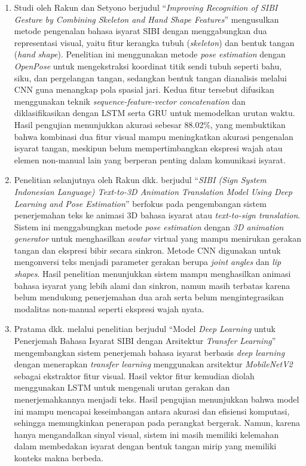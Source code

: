 \begin{enumerate}[noitemsep]
	\item Studi oleh Rakun dan Setyono \cite{RakunSetyono2022} berjudul ``\textit{Improving Recognition of SIBI Gesture by Combining Skeleton and Hand Shape Features}'' mengusulkan metode pengenalan bahasa isyarat SIBI dengan menggabungkan dua representasi visual, yaitu fitur kerangka tubuh (\textit{skeleton}) dan bentuk tangan (\textit{hand shape}). Penelitian ini menggunakan metode \textit{pose estimation} dengan \textit{OpenPose} untuk mengekstraksi koordinat titik sendi tubuh seperti bahu, siku, dan pergelangan tangan, sedangkan bentuk tangan dianalisis melalui CNN guna menangkap pola spasial jari. Kedua fitur tersebut difusikan menggunakan teknik \textit{sequence-feature-vector concatenation} dan diklasifikasikan dengan LSTM serta GRU untuk memodelkan urutan waktu. Hasil pengujian menunjukkan akurasi sebesar 88.02\%, yang membuktikan bahwa kombinasi dua fitur visual mampu meningkatkan akurasi pengenalan isyarat tangan, meskipun belum mempertimbangkan ekspresi wajah atau elemen non-manual lain yang berperan penting dalam komunikasi isyarat. \par
	\item Penelitian selanjutnya oleh Rakun dkk. \cite{RakunDarmana2022} berjudul ``\textit{SIBI (Sign System Indonesian Language) Text-to-3D Animation Translation Model Using Deep Learning and Pose Estimation}'' berfokus pada pengembangan sistem penerjemahan teks ke animasi 3D bahasa isyarat atau \textit{text-to-sign translation}. Sistem ini menggabungkan metode \textit{pose estimation} dengan \textit{3D animation generator} untuk menghasilkan \textit{avatar} virtual yang mampu menirukan gerakan tangan dan ekspresi bibir secara sinkron. Metode CNN digunakan untuk mengonversi teks menjadi parameter gerakan berupa \textit{joint angles} dan \textit{lip shapes}. Hasil penelitian menunjukkan sistem mampu menghasilkan animasi bahasa isyarat yang lebih alami dan sinkron, namun masih terbatas karena belum mendukung penerjemahan dua arah serta belum mengintegrasikan modalitas non-manual seperti ekspresi wajah nyata.
	\item Pratama dkk. \cite{Pratama2025} melalui penelitian berjudul ``Model \textit{Deep Learning} untuk Penerjemah Bahasa Isyarat SIBI dengan Arsitektur \textit{Transfer Learning}'' mengembangkan sistem penerjemah bahasa isyarat berbasis \textit{deep learning} dengan menerapkan \textit{transfer learning} menggunakan arsitektur \textit{MobileNetV2} sebagai ekstraktor fitur visual. Hasil vektor fitur kemudian diolah menggunakan LSTM untuk mengenali urutan gerakan dan menerjemahkannya menjadi teks. Hasil pengujian menunjukkan bahwa model ini mampu mencapai keseimbangan antara akurasi dan efisiensi komputasi, sehingga memungkinkan penerapan pada perangkat bergerak. Namun, karena hanya mengandalkan sinyal visual, sistem ini masih memiliki kelemahan dalam membedakan isyarat dengan bentuk tangan mirip yang memiliki konteks makna berbeda.

\end{enumerate}
